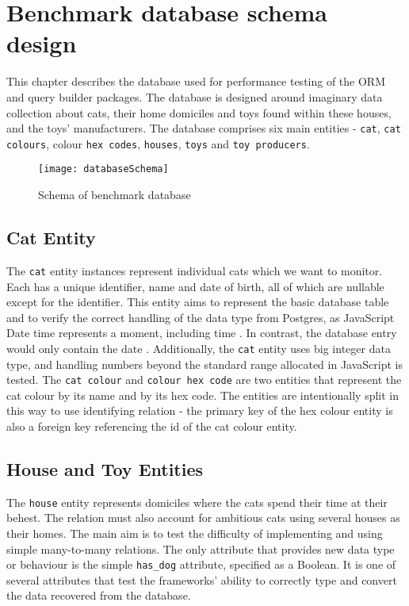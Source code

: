 \chapter{Benchmark database schema design}\label{ch:database}

This chapter describes the database used for performance testing of the ORM and
query builder packages. The database is designed around imaginary data
collection about cats, their home domiciles and toys found within these houses,
and the toys' manufacturers. The database comprises six main entities -
\texttt{cat}, \texttt{cat colours}, colour \texttt{hex codes}, \texttt{houses},
\texttt{toys} and \texttt{toy producers}.

\begin{figure}[b]
    \centering
    \texttt{[image: databaseSchema]}
    \caption{Schema of benchmark database}
\end{figure}

\section{Cat Entity}
The \texttt{cat} entity instances represent individual cats which we want to
monitor. Each has a unique identifier, name and date of birth, all of which are
nullable except for the identifier. This entity aims to represent the basic
database table and to verify the correct handling of the data type from
Postgres, as JavaScript Date time represents a moment, including time
\cite{JavaScript-Date-MDN}. In contrast, the database entry would only contain
the date \cite{Date/TimeTypes_Postgres}. Additionally, the \texttt{cat} entity
uses big integer data type, and handling numbers beyond the standard range
allocated in JavaScript is tested. The \texttt{cat colour} and \texttt{colour
hex code} are two entities that represent the cat colour by its name and by its
hex code. The entities are intentionally split in this way to use identifying
relation \cite{Karwin_2010} - the primary key of the hex colour entity is also a foreign key
referencing the id of the cat colour entity.

\section{House and Toy Entities}
The \texttt{house} entity represents domiciles where the cats spend their time
at their behest. The relation must also account for ambitious cats using several
houses as their homes. The main aim is to test the difficulty of implementing
and using simple many-to-many relations. The only attribute that provides new
data type or behaviour is the simple \verb|has_dog| attribute, specified as a
Boolean. It is one of several attributes that test the frameworks' ability to
correctly type and convert the data recovered from the database.

